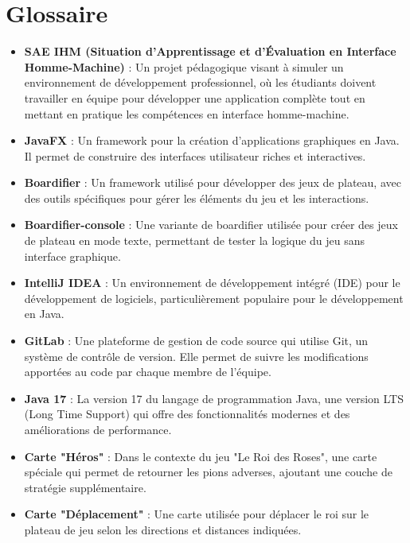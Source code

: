 \chapter{Glossaire}


\begin{itemize}
    \label{sae-ihm}
    \item \textbf{SAE IHM (Situation d'Apprentissage et d'Évaluation en Interface Homme-Machine)} : Un projet pédagogique visant à simuler un environnement de développement professionnel, où les étudiants doivent travailler en équipe pour développer une application complète tout en mettant en pratique les compétences en interface homme-machine.

    \item \textbf{JavaFX} : Un framework pour la création d'applications graphiques en Java. Il permet de construire des interfaces utilisateur riches et interactives.

    \item \textbf{Boardifier} : Un framework utilisé pour développer des jeux de plateau, avec des outils spécifiques pour gérer les éléments du jeu et les interactions.

    \item \textbf{Boardifier-console} : Une variante de boardifier utilisée pour créer des jeux de plateau en mode texte, permettant de tester la logique du jeu sans interface graphique.

    \item \textbf{IntelliJ IDEA} : Un environnement de développement intégré (IDE) pour le développement de logiciels, particulièrement populaire pour le développement en Java.

    \item \textbf{GitLab} : Une plateforme de gestion de code source qui utilise Git, un système de contrôle de version. Elle permet de suivre les modifications apportées au code par chaque membre de l'équipe.

    \item \textbf{Java 17} : La version 17 du langage de programmation Java, une version LTS (Long Time Support) qui offre des fonctionnalités modernes et des améliorations de performance.

    \item \textbf{Carte "Héros"} : Dans le contexte du jeu "Le Roi des Roses", une carte spéciale qui permet de retourner les pions adverses, ajoutant une couche de stratégie supplémentaire.

    \item \textbf{Carte "Déplacement"} : Une carte utilisée pour déplacer le roi sur le plateau de jeu selon les directions et distances indiquées.


\end{itemize}
